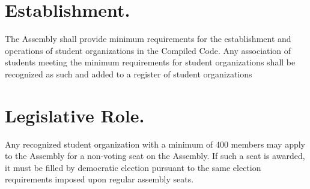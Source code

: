 \section{Establishment.} 
   The Assembly shall provide minimum requirements for the establishment and operations of student organizations in the Compiled Code. Any association of students meeting the minimum requirements for student organizations shall be recognized as such and added to a register of student organizations


\section{Legislative Role.}
    Any recognized student organization with a minimum of 400 members may apply to the Assembly for a non-voting seat on the Assembly. If such a seat is awarded, it must be filled by democratic election pursuant to the same election requirements imposed upon regular assembly seats.